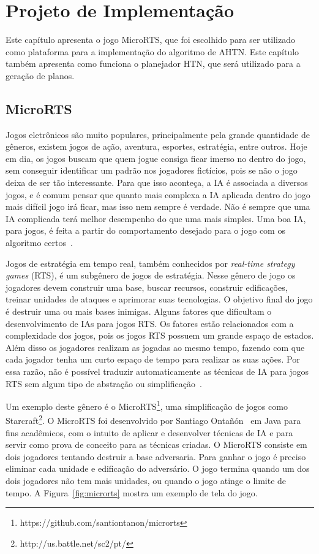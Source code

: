
\chapter{\label{chap:proj}Projeto de Implementação}

Este capítulo apresenta o jogo MicroRTS, que foi escolhido para ser utilizado como plataforma para a implementação do algoritmo de AHTN. Este capítulo também apresenta como funciona o planejador HTN, que será utilizado para a geração de planos.

\section{MicroRTS}  \label{sec:microrts}

Jogos eletrônicos são muito populares, principalmente pela grande quantidade de gêneros, existem jogos de ação, aventura, esportes, estratégia, entre outros. Hoje em dia, os jogos buscam que quem jogue consiga ficar imerso no dentro do jogo, sem conseguir identificar um padrão nos jogadores fictícios, pois se não o jogo deixa de ser tão interessante. Para que isso aconteça, a IA é associada a diversos jogos, e é comum pensar que quanto mais complexa a IA aplicada dentro do jogo mais difícil jogo irá ficar, mas isso nem sempre é verdade. Não é sempre que uma IA complicada terá melhor desempenho do que uma mais simples. Uma boa IA, para jogos, é feita a partir do comportamento desejado para o jogo com os algoritmo certos~\cite{millington2009artificial}.

Jogos de estratégia em tempo real, também conhecidos por \textit{real-time strategy games} (RTS), é um subgênero de jogos de estratégia. 
Nesse gênero de jogo os jogadores devem construir uma base, buscar recursos, construir edificações, treinar unidades de ataques e aprimorar suas tecnologias.
O objetivo final do jogo é destruir uma ou mais bases inimigas. 
Alguns fatores que dificultam o desenvolvimento de IAs para jogos RTS. 
Os fatores estão relacionados com a complexidade dos jogos, pois os jogos RTS possuem um grande espaço de estados.
Além disso os jogadores realizam as jogadas ao mesmo tempo, fazendo com que cada jogador tenha um curto espaço de tempo para realizar as suas ações.
Por essa razão, não é possível traduzir automaticamente as técnicas de IA para jogos RTS sem algum tipo de abstração ou simplificação~\cite{ontanon2013survey, buro2012real}.

Um exemplo deste gênero é o MicroRTS\footnote{https://github.com/santiontanon/microrts}, uma simplificação de jogos como Starcraft\footnote{http://us.battle.net/sc2/pt/}. 
O MicroRTS foi desenvolvido por Santiago Ontañón~\cite{ontanon2013combinatorial} em Java para fins acadêmicos, com o intuito de aplicar e desenvolver técnicas de IA e para servir como prova de conceito para as técnicas criadas.
O MicroRTS consiste em dois jogadores tentando destruir a base adversaria. 
Para ganhar o jogo é preciso eliminar cada unidade e edificação do adversário. 
O jogo termina quando um dos dois jogadores não tem mais unidades, ou quando o jogo atinge o limite de tempo. 
A Figura~\ref{fig:microrts} mostra um exemplo de tela do jogo.


